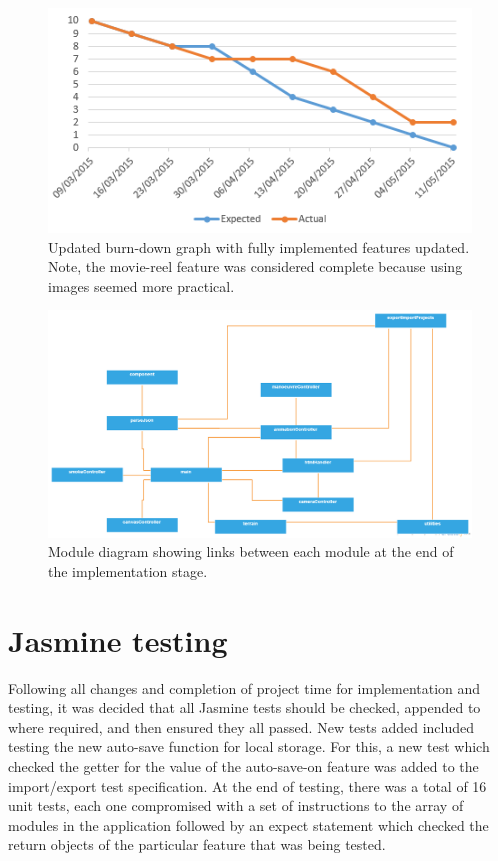 \begin{figure}[h!]
  \centering
      \includegraphics[width=1\textwidth]{images/burndownnew.png}
  \caption{Updated burn-down graph with fully implemented features updated. Note, the movie-reel feature was considered complete because using images seemed more practical.}
  \label{fig:newburndown}
\end{figure}

\begin{figure}[h!]
  \centering
      \includegraphics[width=1\textwidth]{images/mod_after.png}
  \caption{Module diagram showing links between each module at the end of the implementation stage.}
  \label{fig:mod_after}
\end{figure}

\section{Jasmine testing}
Following all changes and completion of project time for implementation and testing, it was decided that all Jasmine tests should be checked, appended to where required, and then ensured they all passed. New tests added included testing the new auto-save function for local storage. For this, a new test which checked the getter for the value of the auto-save-on feature was added to the import/export test specification. At the end of testing, there was a total of 16 unit tests, each one compromised with a set of instructions to the array of modules in the application followed by an expect statement which checked the return objects of the particular feature that was being tested.

